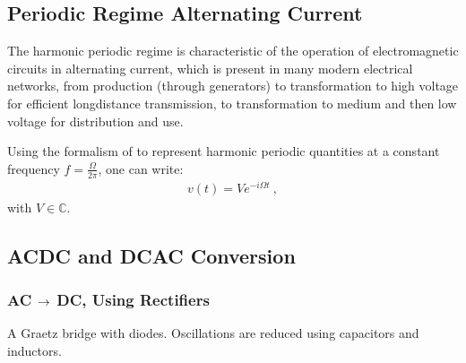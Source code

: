 \documentclass[letterpaper,10pt,english]{jupyterBook}
\begin{document}
\subsection{Periodic Regime \sphinxhyphen{} Alternating Current}
\label{\detokenize{ch/circuits-electric-regimes:periodic-regime-alternating-current}}\label{\detokenize{ch/circuits-electric-regimes:physics-hs-electromagnetism-circuits-electric-regimes-ac}}
\sphinxAtStartPar
The harmonic periodic regime is characteristic of the operation of electromagnetic circuits in alternating current, which is present in many modern electrical networks, from production (through generators) to transformation to high voltage for efficient long\sphinxhyphen{}distance transmission, to transformation to medium and then low voltage for distribution and use.

\sphinxAtStartPar
Using the formalism of  to represent harmonic periodic quantities at a constant frequency \(f = \frac{\Omega}{2 \pi}\), one can write:
\begin{equation*}
\begin{split}v(t) = V e^{-i \Omega t} \ ,\end{split}
\end{equation*}
\sphinxAtStartPar
with \(V \in \mathbb{C}\). 

\sphinxAtStartPar
{}

\sphinxAtStartPar
{}


\subsection{AC\sphinxhyphen{}DC and DC\sphinxhyphen{}AC Conversion}
\label{\detokenize{ch/circuits-electric-regimes:ac-dc-and-dc-ac-conversion}}\label{\detokenize{ch/circuits-electric-regimes:physics-hs-electromagnetism-circuits-electric-regimes-conversion}}

\subsubsection{AC \protect\(\rightarrow\protect\) DC, Using Rectifiers}
\label{\detokenize{ch/circuits-electric-regimes:ac-rightarrow-dc-using-rectifiers}}\label{\detokenize{ch/circuits-electric-regimes:physics-hs-electromagnetism-circuits-electric-regimes-conversion-rectifier}}
\sphinxAtStartPar
A Graetz bridge with diodes. Oscillations are reduced using capacitors and inductors.
\end{document}
